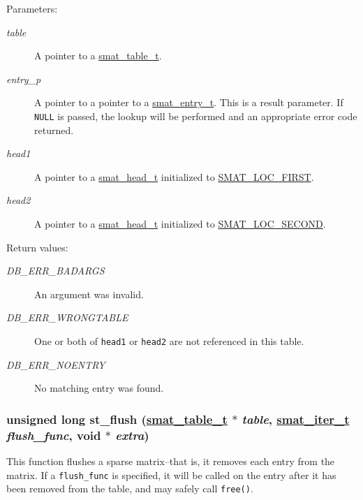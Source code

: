 \begin{Desc}
\item[Parameters:]
\begin{description}
\item[{\em table}]A pointer to a \hyperlink{group__dbprim__smat_a0}{smat\_\-table\_\-t}. \item[{\em entry\_\-p}]A pointer to a pointer to a \hyperlink{group__dbprim__smat_a2}{smat\_\-entry\_\-t}. This is a result parameter. If {\tt NULL} is passed, the lookup will be performed and an appropriate error code returned. \item[{\em head1}]A pointer to a \hyperlink{group__dbprim__smat_a1}{smat\_\-head\_\-t} initialized to \hyperlink{group__dbprim__smat_a47a135}{SMAT\_\-LOC\_\-FIRST}. \item[{\em head2}]A pointer to a \hyperlink{group__dbprim__smat_a1}{smat\_\-head\_\-t} initialized to \hyperlink{group__dbprim__smat_a47a136}{SMAT\_\-LOC\_\-SECOND}.\end{description}
\end{Desc}
\begin{Desc}
\item[Return values:]
\begin{description}
\item[{\em DB\_\-ERR\_\-BADARGS}]An argument was invalid. \item[{\em DB\_\-ERR\_\-WRONGTABLE}]One or both of {\tt head1} or {\tt head2} are not referenced in this table. \item[{\em DB\_\-ERR\_\-NOENTRY}]No matching entry was found. \end{description}
\end{Desc}
\hypertarget{group__dbprim__smat_a14}{
\subsubsection[st\_\-flush]{\setlength{\rightskip}{0pt plus 5cm}unsigned long st\_\-flush (\hyperlink{dbprim_8h_a0}{smat\_\-table\_\-t} $\ast$ {\em table}, \hyperlink{dbprim_8h_a4}{smat\_\-iter\_\-t} {\em flush\_\-func}, void $\ast$ {\em extra})}}
\label{group__dbprim__smat_a14}


This function flushes a sparse matrix--that is, it removes each entry from the matrix. If a {\tt flush\_\-func} is specified, it will be called on the entry after it has been removed from the table, and may safely call {\tt free()}.

